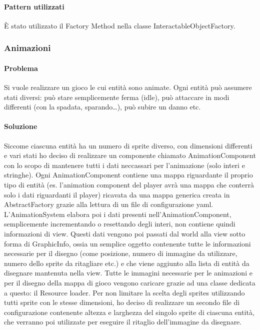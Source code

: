 \documentclass[a4paper,12pt]{report}
\begin{document}
\paragraph*{Pattern utilizzati}
	È stato utilizzato il Factory Method nella classe InteractableObjectFactory.

\subsubsection*{Animazioni}
\paragraph*{Problema}
	Si vuole realizzare un gioco le cui entità sono animate. Ogni entità può assumere stati diversi: può stare semplicemente ferma (idle), può attaccare in modi differenti (con la spadata, sparando…), può subire un danno etc.
\paragraph*{Soluzione}
	Siccome ciascuna entità ha un numero di sprite diverso, con dimensioni differenti e vari stati ho deciso di realizzare un componente chiamato AnimationComponent con lo scopo di mantenere tutti i dati neccassari per l'animazione (solo interi e stringhe). Ogni AnimationComponent contiene una mappa riguardante il proprio tipo di entità (es. l'animation component del player avrà una mappa che conterrà solo i dati riguardanti il player) ricavata da una mappa generica creata in AbstractFactory grazie alla lettura di un file di configurazione yaml.
	L'AnimationSystem elabora poi i dati presenti nell'AnimationComponent, semplicemente incrementando o resettando degli interi, non contiene quindi informazioni di view. 
	Questi dati vengono poi passati dal world alla view sotto forma di GraphicInfo, ossia un semplice oggetto contenente tutte le informazioni necessarie per il disegno (come posizione, numero di immagine da utilizzare, numero dello sprite da ritagliare etc.) e che viene aggiunto alla lista di entità da disegnare mantenuta nella view.
	Tutte le immagini necessarie per le animazioni e per il disegno della mappa di gioco vengono caricare grazie ad una classe dedicata a questo: il Resource loader.
	Per non limitare la scelta degli sprites utilizzando tutti sprite con le stesse dimensioni, ho deciso di realizzare un secondo file di configurazione contenente altezza e larghezza del singolo sprite di ciascuna entità, che verranno poi utilizzate per eseguire il ritaglio dell'immagine da disegnare.
\end{document}
